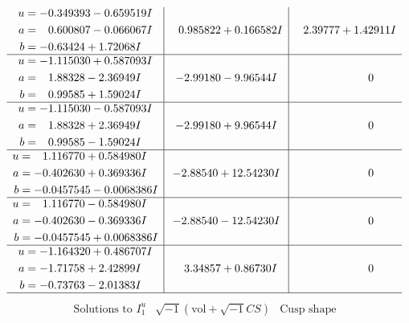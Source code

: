 \documentclass[1p]{elsarticle_modified}
\theoremstyle{definition}
\newcommand{\I}{\sqrt{-1}}
\begin{document}
$$\begin{array}{c|c|c}
\begin{aligned}
u &= -0.349393 - 0.659519 I \\
a &= \phantom{-}0.600807 - 0.066067 I \\
b &= -0.63424 + 1.72068 I\end{aligned}
 & \phantom{-}0.985822 + 0.166582 I & \phantom{-}2.39777 + 1.42911 I \\ \hline\begin{aligned}
u &= -1.115030 + 0.587093 I \\
a &= \phantom{-}1.88328 - 2.36949 I \\
b &= \phantom{-}0.99585 + 1.59024 I\end{aligned}
 & -2.99180 - 9.96544 I & \phantom{-0.000000 } 0 \\ \hline\begin{aligned}
u &= -1.115030 - 0.587093 I \\
a &= \phantom{-}1.88328 + 2.36949 I \\
b &= \phantom{-}0.99585 - 1.59024 I\end{aligned}
 & -2.99180 + 9.96544 I & \phantom{-0.000000 } 0 \\ \hline\begin{aligned}
u &= \phantom{-}1.116770 + 0.584980 I \\
a &= -0.402630 + 0.369336 I \\
b &= -0.0457545 - 0.0068386 I\end{aligned}
 & -2.88540 + 12.54230 I & \phantom{-0.000000 } 0 \\ \hline\begin{aligned}
u &= \phantom{-}1.116770 - 0.584980 I \\
a &= -0.402630 - 0.369336 I \\
b &= -0.0457545 + 0.0068386 I\end{aligned}
 & -2.88540 - 12.54230 I & \phantom{-0.000000 } 0 \\ \hline\begin{aligned}
u &= -1.164320 + 0.486707 I \\
a &= -1.71758 + 2.42899 I \\
b &= -0.73763 - 2.01383 I\end{aligned}
 & \phantom{-}3.34857 + 0.86730 I & \phantom{-0.000000 } 0\\
 \hline 
 \end{array}$$\newpage$$\begin{array}{c|c|c}  
\text{Solutions to }I^u_{1}& \I (\text{vol} + \sqrt{-1}CS) & \text{Cusp shape}\\
 \hline 
\begin{aligned}

\end{aligned}
\end{array}$$
\end{document}
